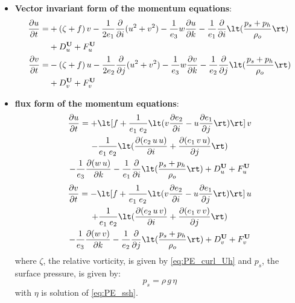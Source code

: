 \documentclass[../main/NEMO_manual]{subfiles}
\begin{document}
\begin{itemize}
\item
  \textbf{Vector invariant form of the momentum equations}:
  \begin{equation}
    \label{eq:PE_dyn_vect}
    \begin{split}
      \pd[u]{t} = &+ (\zeta + f) \, v - \frac{1}{2 e_1} \pd[]{i} (u^2 + v^2)
                   - \frac{1}{e_3} w \pd[u]{k} - \frac{1}{e_1} \pd[]{i} \lt( \frac{p_s + p_h}{\rho_o} \rt) \\
                  &+ D_u^{\vect U} + F_u^{\vect U} \\
      \pd[v]{t} = &- (\zeta + f) \, u - \frac{1}{2 e_2} \pd[]{j} (u^2 + v^2)
                   - \frac{1}{e_3} w \pd[v]{k} - \frac{1}{e_2} \pd[]{j} \lt( \frac{p_s + p_h}{\rho_o} \rt) \\ 
                  &+ D_v^{\vect U} + F_v^{\vect U}
    \end{split}
  \end{equation}
\item
  \textbf{flux form of the momentum equations}:
  \begin{multline*}
    \pd[u]{t} = + \lt[ f + \frac{1}{e_1 \; e_2} \lt( v \pd[e_2]{i} - u \pd[e_1]{j} \rt) \rt] \, v \\
                - \frac{1}{e_1 \; e_2} \lt( \pd[(e_2 \, u \, u)]{i} + \pd[(e_1 \, v \, u)]{j} \rt) \\
                - \frac{1}{e_3} \pd[(w \, u)]{k} - \frac{1}{e_1} \pd[]{i} \lt( \frac{p_s + p_h}{\rho_o} \rt)
                + D_u^{\vect U} + F_u^{\vect U}
  \end{multline*}
  \begin{multline*}
    \pd[v]{t} = - \lt[ f + \frac{1}{e_1 \; e_2} \lt( v \pd[e_2]{i} - u \pd[e_1]{j} \rt) \rt] \, u \\
                + \frac{1}{e_1 \; e_2} \lt( \pd[(e_2 \, u \, v)]{i} + \pd[(e_1 \, v \, v)]{j} \rt) \\
                - \frac{1}{e_3} \pd[(w \, v)]{k} - \frac{1}{e_2} \pd[]{j} \lt( \frac{p_s + p_h}{\rho_o} \rt)
                + D_v^{\vect U} + F_v^{\vect U}
  \end{multline*}
  where $\zeta$, the relative vorticity, is given by \autoref{eq:PE_curl_Uh} and $p_s$, the surface pressure,
  is given by:
  \[
    p_s = \rho \,g \, \eta
  \]
  with $\eta$ is solution of \autoref{eq:PE_ssh}.


\end{itemize}
\end{document}

